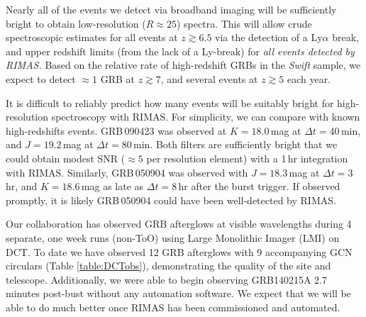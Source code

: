 \documentclass[letterpaper,11pt]{article}
\begin{document}
Nearly all of the events we detect via broadband imaging will be sufficiently 
bright to obtain low-resolution ($R \approx 25$) spectra.  This will allow crude
spectroscopic estimates for all events at $z \gtrsim 6.5$ via the detection of a
Ly$\alpha$ break, and upper redshift limits (from the lack of a Ly-break)
for \textit{all events detected by RIMAS.}  Based on the relative rate of 
high-redshift GRBs in the \textit{Swift} sample\cite{pcb+09,gkk+11}, we expect 
to detect $\approx 1$ GRB at $z \gtrsim 7$, and several events at $z \gtrsim 5$ 
each year. 

It is difficult to reliably predict how many events will be suitably bright 
for high-resolution spectroscopy with RIMAS.  For simplicity, we can compare with known
high-redshifts events.  GRB\,090423\cite{tfl+09} was observed at $K = 18.0$\,mag at
$\Delta t = 40$\,min, and $J = 19.2$\,mag at $\Delta t = 80$\,min.  Both filters are 
sufficiently bright that we could obtain modest SNR ($\approx 5$ per resolution
element) with a 1\,hr integration with RIMAS.  Similarly, GRB\,050904\cite{hnr+05}
was observed with $J = 18.3$\,mag at $\Delta t = 3$\,hr, and $K = 18.6$\,mag as
late as $\Delta t = 8$\,hr after the burst trigger.  If observed promptly, it is likely
GRB\,050904 could have been well-detected by RIMAS.

Our collaboration has observed GRB afterglows at visible wavelengths during 4 separate, one week runs (non-ToO) using Large Monolithic Imager (LMI) on DCT. To date we have observed 12 GRB afterglows with 9 accompanying GCN circulars (Table \ref{table:DCTobs}), demonstrating the quality of the site and telescope. Additionally, we were able to begin observing GRB140215A 2.7 minutes post-bust without any automation software.  We expect that we will be able to do much better once RIMAS has been commissioned and automated. \\
\end{document}

